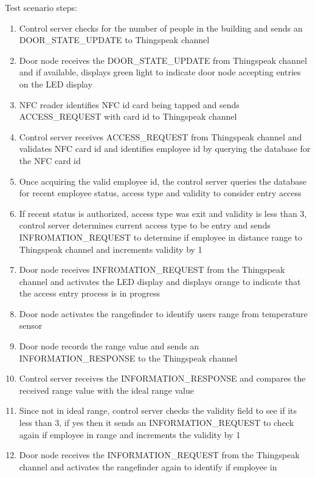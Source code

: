 \noindent
Test scenario steps:
\begin{enumerate}
    \item Control server checks for the number of people in the building and
          sends an DOOR\_STATE\_UPDATE to Thingspeak channel
    \item Door node receives the DOOR\_STATE\_UPDATE from Thingspeak channel and
          if available, displays green light to indicate door node accepting
          entries on the LED display
    \item NFC reader identifies NFC id card being tapped and sends
          ACCESS\_REQUEST with card id to Thingspeak channel
    \item Control server receives ACCESS\_REQUEST from Thingspeak channel and
          validates NFC card id and identifies employee id by querying the
          database for the NFC card id 
    \item Once acquiring the valid employee id, the control server queries the
          database for recent employee status, access type and validity to
          consider entry access
    \item If recent status is authorized, access type was exit and validity is
          less than 3, control server determines current access type to be entry
          and sends INFROMATION\_REQUEST to determine if employee in distance
          range to Thingspeak channel and increments validity by 1
    \item Door node receives INFROMATION\_REQUEST from the Thingspeak channel
          and activates the LED display and displays orange to indicate that
          the access entry process is in progress 
    \item Door node activates the rangefinder to identify users range from
          temperature sensor
    \item Door node records the range value and sends an INFORMATION\_RESPONSE
          to the Thingspeak channel
    \item Control server receives the INFORMATION\_RESPONSE and compares the
          received range value with the ideal range value
    \item Since not in ideal range, control server checks the validity field to
          see if its less than 3, if yes then it sends an INFORMATION\_REQUEST
          to check again if employee in range and increments the validity by 1 
    \item Door node receives the INFORMATION\_REQUEST from the Thingspeak
          channel and activates the rangefinder again to identify if employee in

\end{enumerate}
